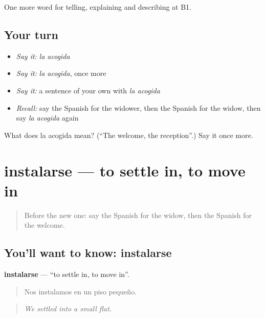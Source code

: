 \begin{grammarlens}[title={What you've built}]
One more word for telling, explaining and describing at B1.
\end{grammarlens}

\subsection*{Your turn}
\begin{itemize}
\raggedright
  \item \emph{Say it:} \emph{la acogida}
  \item \emph{Say it:} \emph{la acogida}, once more
  \item \emph{Say it:} a sentence of your own with \emph{la acogida}
  \item \emph{Recall:} say the Spanish for the widower, then the Spanish for the widow, then say \emph{la acogida} again
\end{itemize}

\begin{tcolorbox}[breakable,colback=teal!4,colframe=teal!35!black,title={Before you move on}]
What does la acogida mean? (\textquotedblleft{}The welcome, the reception\textquotedblright{}.) Say it once more.
\end{tcolorbox}
\section[instalarse]{instalarse — to settle in, to move in}

\label{lesson:ES-C551-instalarse}



\begin{quote}
Before the new one: say the Spanish for the widow, then the Spanish for the welcome.
\end{quote}

\subsection*{You'll want to know: instalarse}
\textbf{instalarse} — \textquotedblleft{}to settle in, to move in\textquotedblright{}.

\begin{quote}
Nos instalamos en un piso pequeño.
\end{quote}

\begin{quote}
\emph{We settled into a small flat.}
\end{quote}

